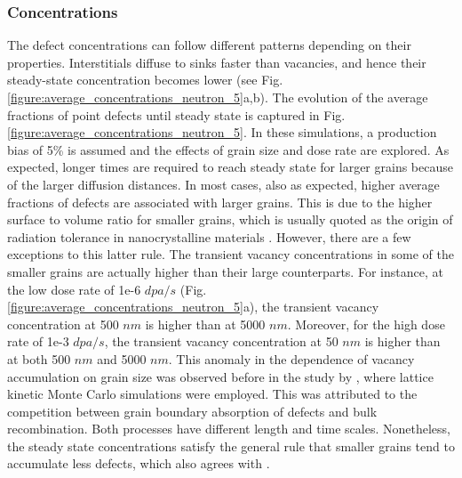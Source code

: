 \documentclass[utf8]{frontiersSCNS} %
\begin{document}
 \subsubsection{Concentrations}
 
    The defect concentrations can follow different patterns depending on their properties. Interstitials diffuse to sinks faster than vacancies, and hence their steady-state concentration becomes lower (see Fig. \ref{figure:average_concentrations_neutron_5}a,b).  The evolution of the average fractions of point defects until steady state is captured in Fig. \ref{figure:average_concentrations_neutron_5}.  In these simulations, a production bias of 5\% is assumed and the effects of grain size and dose rate are explored. As expected, longer times are required to reach steady state for larger grains because of the larger diffusion distances. In most cases, also as expected, higher average fractions of defects are associated with larger grains. This is due to the higher surface to volume ratio for smaller grains, which is usually quoted as the origin of radiation tolerance in nanocrystalline materials \citep{was2017,yang2010,demkowicz2011}. However, there are a few exceptions to this latter rule. The transient vacancy concentrations in some of the smaller grains are actually higher than their large counterparts.  For instance, at the low dose rate of 1e-6 $dpa/s$ (Fig. \ref{figure:average_concentrations_neutron_5}a), the transient vacancy concentration at 500 $nm$ is higher than at 5000 $nm$. Moreover, for the high dose rate of 1e-3 $dpa/s$, the transient vacancy concentration at 50 $nm$ is higher than at both 500 $nm$ and 5000 $nm$. This anomaly in the dependence of vacancy accumulation on grain size was observed before in the study by \citep{yang2010}, where lattice kinetic Monte Carlo simulations were employed. This was attributed to the competition between grain boundary absorption of defects and bulk recombination. Both processes have different length and time scales. Nonetheless, the steady state concentrations satisfy the general rule that smaller grains tend to accumulate less defects, which also agrees with \citep{yang2010}.
    
\end{document}
